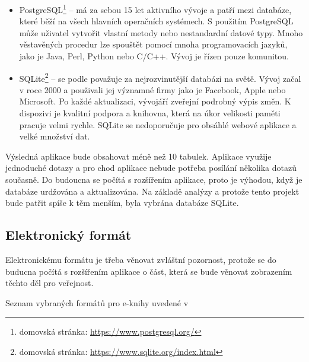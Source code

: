 \begin{itemize}
                \item PostgreSQL\footnote{domovská stránka: \url{https://www.postgresql.org/}} – má za sebou 15 let aktivního vývoje a patří mezi databáze, které běží na všech hlavních operačních systémech. S použitím PostgreSQL může uživatel vytvořit vlastní metody nebo nestandardní datové typy. Mnoho věstavěných procedur lze spouštět pomocí mnoha programovacích jazyků, jako je Java, Perl, Python nebo C/C++. Vývoj je řízen pouze komunitou.
                
                \item SQLite\footnote{domovská stránka: \url{https://www.sqlite.org/index.html}} – se podle \cite{database} považuje za nejrozvinutější databázi na světě. Vývoj začal v roce 2000 a použivali jej významné firmy jako je Facebook, Apple nebo Microsoft. Po každé aktualizaci, vývojáří zveřejní podrobný výpis změn. K dispozivi je kvalitní podpora a knihovna, která na úkor velikosti paměti pracuje velmi rychle. SQLite se nedoporučuje pro obsáhlé webové aplikace a velké množství dat. 
                
        \end{itemize}
        
        Výsledná aplikace bude obsahovat méně než 10 tabulek. Aplikace využije jednoduché dotazy a pro chod aplikace nebude potřeba posílání několika dotazů současně. Do budoucna se počítá s rozšířením aplikace, proto je výhodou, když je databáze urdžována a aktualizována. Na základě analýzy a protože tento projekt bude patřit spíše k těm menším, byla vybrána databáze SQLite.
        
        \subsection{Elektronický formát}
            \cite{electronic-format}
            
            Elektronickému formátu je třeba věnovat zvláštní pozornost, protože se do buducna počítá s rozšířením aplikace o část, která se bude věnovat zobrazením těchto děl pro veřejnost.
            
            Seznam vybraných formátů pro e-knihy uvedené v \cite{electronic-format}
            
